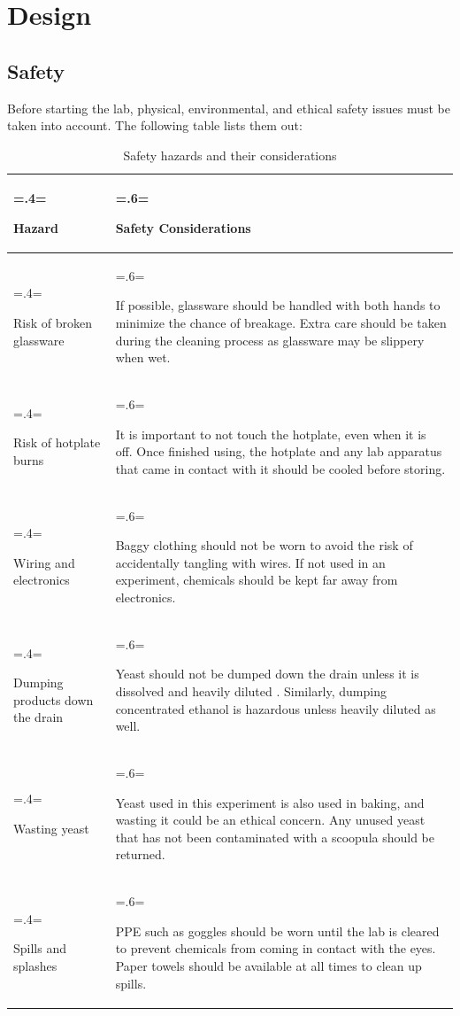 \documentclass{article}
\begin{document}
\newpage

\section{Design}

\subsection{Safety}
Before starting the lab, physical, environmental, and ethical safety issues must be taken into account. The following table lists them out:
\begin{table}[H]
\centering
\caption{Safety hazards and their considerations}
\label{table:1}
\begin{tabularx}{\textwidth} {
    | >{\hsize=.4\hsize \linewidth=\hsize \raggedright\arraybackslash}X
    | >{\hsize=.6\hsize \linewidth=\hsize \raggedright\arraybackslash}X |
}
    \hline
    \textbf{Hazard} & \textbf{Safety Considerations} \\
    \hline
    Risk of broken glassware & If possible, glassware should be handled with both hands to minimize the chance of breakage. Extra care should be taken during the cleaning process as glassware may be slippery when wet.\\
    \hline
    Risk of hotplate burns & It is important to not touch the hotplate, even when it is off. Once finished using, the hotplate and any lab apparatus that came in contact with it should be cooled before storing.\\
    \hline
    Wiring and electronics & Baggy clothing should not be worn to avoid the risk of accidentally tangling with wires. If not used in an experiment, chemicals should be kept far away from electronics.\\
    \hline
    Dumping products down the drain & Yeast should not be dumped down the drain unless it is dissolved and heavily diluted \parencite{baking-yeast-disposal}. Similarly, dumping concentrated ethanol is hazardous unless heavily diluted as well. \parencite{sewer-disposal}\\
    \hline
    Wasting yeast & Yeast used in this experiment is also used in baking, and wasting it could be an ethical concern. Any unused yeast that has not been contaminated with a scoopula should be returned.\\
    \hline
    Spills and splashes & PPE such as goggles should be worn until the lab is cleared to prevent chemicals from coming in contact with the eyes. Paper towels should be available at all times to clean up spills.\\
    \hline
\end{tabularx}
\end{table}
\end{document}
